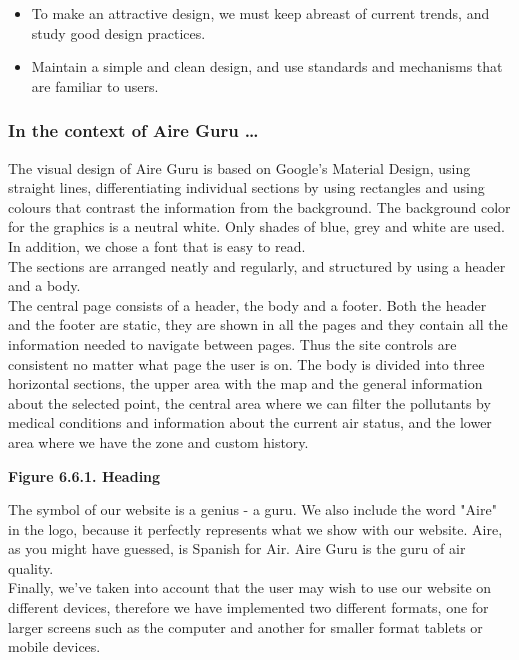 \begin{itemize}
    \item To make an attractive design, we must keep abreast of current trends, and study good design practices.
    \item Maintain a simple and clean design, and use standards and mechanisms that are familiar to users.
\end{itemize}

\subsubsection*{In the context of Aire Guru \ldots}

The visual design of Aire Guru is based on Google's Material Design, using straight lines, differentiating individual sections by using rectangles
and using colours that contrast the information from the background.
The background color for the graphics is a neutral white.
Only shades of blue, grey and white are used. In addition, we chose a font that is easy to read.\\

The sections are arranged neatly and regularly, and structured by using a header and a body.\\

The central page consists of a header, the body and a footer. Both the header and the footer are static,
they are shown in all the pages and they contain all the information needed to navigate between pages. Thus the site controls are consistent no matter what page the user is on.
The body is divided into three horizontal sections, the upper area with the map and the general information about the selected point,
the central area where we can filter the pollutants by medical conditions and information about the current air status, and the
lower area where we have the zone and custom history.\\

\begin{center}
    \bf{     
    Figure 6.6.1. Heading}
  \end{center} 
 
The symbol of our website is a genius - a guru. We also include the word "Aire" in the logo, because it perfectly represents 
what we show with our website. Aire, as you might have guessed, is Spanish for Air. Aire Guru is the guru of air quality. \\

Finally, we've taken into account that the user may wish to use our website on different devices, therefore we have implemented
two different formats, one for larger screens such as the computer and another for smaller format tablets or mobile devices.